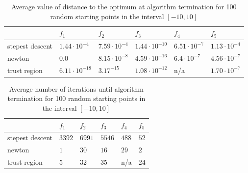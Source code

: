 \documentclass[a4paper]{article}
\begin{document}
\begin{table}[]
\centering
\begin{tabular}{|l|l|l|l|l|l|}
\hline
                 & $f_1$         & $f_2$         & $f_3$       & $f_4$       & $f_5$       \\ \hline
stepest descent & $1.44\cdot10^{-4}$ & $7.59\cdot10^{-4}$ & $1.44\cdot10^{-10}$ & $6.51\cdot10^{-7}$ & $1.13\cdot 10^{-4}$ \\ \hline
newton           & $0.0$      & $8.15\cdot10^{-8}$ & $4.59\cdot10^{-16}$ & $6.4\cdot10^{-7}$  & $4.56\cdot10^{-7}$ \\ \hline
trust region    & $6.11\cdot 10^{-18}$  & $3.17^{-15}$ &  $1.08\cdot10^{-12}$ & n/a & $1.70 \cdot 10^{-7}$ \\ \hline
\end{tabular}
\caption{Average value of distance to the optimum at algorithm termination for 100 random starting points in the interval $[-10,10]$}
\label{table1}
\end{table}

\begin{table}[]
\centering
\begin{tabular}{|l|l|l|l|l|l|}
\hline
                 & $f_1$  & $f_2$  & $f_3$   & $f_4$ & $f_5$  \\ \hline
stepest descent  & $3392$ & $6991$ & $5546$ & $488$ & $52$  \\ \hline
newton           & $1$    & $30$   & $16$   & $29$  & $2 $  \\ \hline
trust region     & $5$    & $32$   & $35$   & n/a   & $24 $ \\ \hline
\end{tabular}
\caption{Average number of iterations until algorithm termination for 100 random starting points in the interval $[-10,10]$}
\label{table2}
\end{table}
\end{document}
